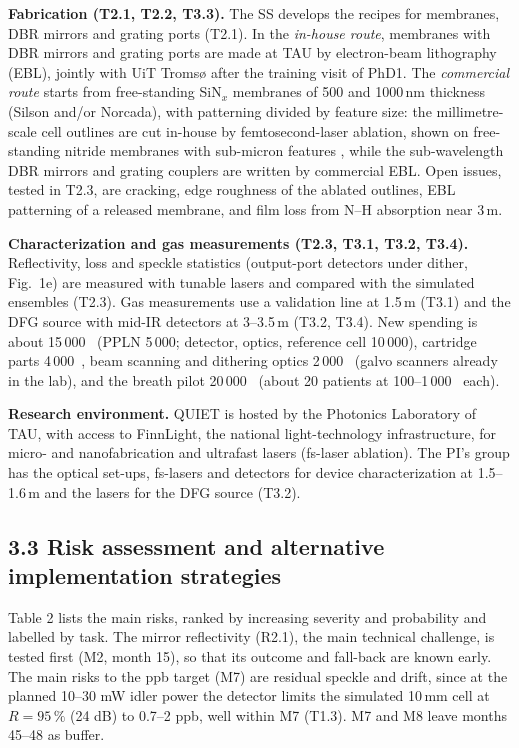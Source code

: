 \documentclass[a4paper,12pt]{article}
\newcommand{\wc}[1]{\textcolor{dkmaroon}{#1}} %
\newcommand{\jc}[1]{\textcolor{dkrust}{#1}} %
\newcommand{\nc}[1]{\textcolor{dkleaf}{#1}} %
\begin{document}
\textbf{Fabrication (T2.1, T2.2, T3.3).} The SS develops the recipes for membranes, DBR mirrors \nc{and grating ports} (T2.1). In the \emph{in-house route}, membranes with DBR mirrors \nc{and grating ports} are made at TAU by electron-beam lithography (EBL), jointly with UiT Tromsø after the training visit of PhD1. The \emph{commercial route} starts from free-standing SiN$_x$ membranes of 500 and 1000\,nm thickness (Silson and/or Norcada), with patterning divided by feature size: the millimetre-scale cell outlines are cut in-house by femtosecond-laser ablation, shown on free-standing nitride membranes with sub-micron features \cite{Nikbakht2023,Uesugi2020}, while the sub-wavelength DBR mirrors and grating couplers are written by commercial EBL. Open issues, tested in T2.3, are cracking, edge roughness of the ablated outlines, EBL patterning of a released membrane, and film loss from N--H absorption near 3\,\textmu{}m.

\textbf{Characterization and gas measurements (T2.3, T3.1, T3.2, T3.4).} Reflectivity, loss and speckle statistics (output-port detectors under dither, Fig.~1e) are measured with tunable lasers and compared with the simulated ensembles (T2.3). Gas measurements use a validation line at 1.5\,\textmu{}m (T3.1) and the DFG source with mid-IR detectors at 3--3.5\,\textmu{}m (T3.2, T3.4). New spending is about 15\,000~\texteuro{} (PPLN 5\,000; detector, optics, reference cell 10\,000), \jc{cartridge parts 4\,000~\texteuro{}, beam scanning and dithering optics 2\,000~\texteuro{} (galvo scanners already in the lab), and the breath pilot 20\,000~\texteuro{} (about 20 patients at 100--1\,000~\texteuro{} each)}.

\textbf{Research environment.} QUIET is hosted by the Photonics Laboratory of TAU, with access to FinnLight, the national light-technology infrastructure, for micro- and nanofabrication and ultrafast lasers (fs-laser ablation). The PI's group has the optical set-ups, fs-lasers and detectors for device characterization at 1.5--1.6\,\textmu{}m and the lasers for the DFG source (T3.2).  

\subsection*{3.3 Risk assessment and alternative implementation strategies}

\jc{Table 2 lists the main risks, ranked by increasing severity and probability and labelled by task. The mirror reflectivity (R2.1), the main technical challenge, is tested first (M2, month 15), so that its outcome and fall-back are known early. The main risks to the ppb target (M7) are residual speckle and drift, since at the planned 10--30 mW idler power the detector \wc{limits the simulated 10\,mm cell at $R=95\,\%$ (24 dB) to 0.7--2 ppb, well within M7} (T1.3). M7 and M8 leave months 45--48 as buffer.}
\end{document}
